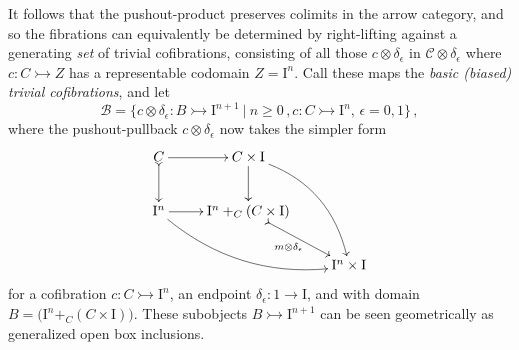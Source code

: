\documentclass[11pt]{article}
\newcommand{\mono}{\ensuremath{\rightarrowtail}}
\newcommand{\I}{\ensuremath{\mathrm{I}}}
\theoremstyle{remark}
\theoremstyle{definition}
\begin{document}
It follows that the pushout-product preserves colimits in the arrow category, and so the fibrations can equivalently be determined by right-lifting against a generating \emph{set} of trivial cofibrations, consisting of all those $c \otimes \delta_\epsilon$ in $\mathcal{C}\otimes \delta_\epsilon$ where $c : C \mono Z$ has a representable codomain $Z=\I^n$.  Call these maps the \emph{basic (biased) trivial cofibrations}, and let 
\begin{equation}\label{eq:basictrivcof}
\mathcal{B} = \{c \otimes \delta_\epsilon : B \mono \I^{n+1}\ |\ n\geq 0\,, c : C\mono \I^n,\,\epsilon = 0,1\}\,,
\end{equation}
where the pushout-pullback $c\otimes\delta_\epsilon$ now takes the simpler form
\begin{equation}\label{diagram:basicpushoutproduct}
\xymatrix{
C \ar@{>->}[d] \ar[r] & C\times \I \ar[d] \ar@/^4ex/ [rdd]\\
\I^{n} \ar@/_4ex/ [rrd] \ar[r] &  \I^n +_C (C\times\I) \ar@{>->}[rd]_{m \otimes \delta_\epsilon} \\
&& \I^{n}\times\I
}
\end{equation}
for a cofibration $c : C\mono \I^n$, an endpoint $\delta_\epsilon:1 \to \I$, and with domain $B = \big(\I^n +_C (C\times\I)\big)$.   These subobjects $B \mono \I^{n+1}$ can be seen geometrically as generalized open box inclusions.
\end{document}
